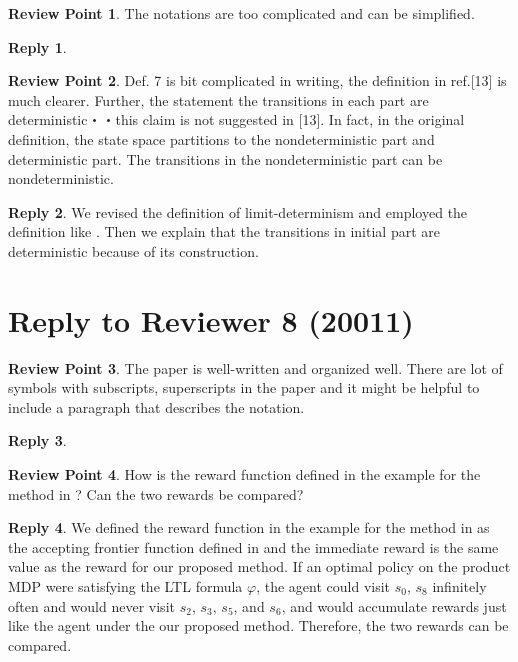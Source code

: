 \documentclass[10 pt, dvipdfmx]{article}
\theoremstyle{definition}
\newtheorem{review point}{Review Point}[section]
\newtheorem*{reply}{Reply}
\begin{document}
\begin{review point}
  The notations are too complicated and can be simplified.
\end{review point}

\begin{reply}

\end{reply}

\begin{review point}
  Def. 7 is bit complicated in writing, the definition in ref.[13] is
much clearer. Further, the statement the transitions in each part are
deterministic・・this claim is not suggested in [13]. In fact, in the
original definition, the state space partitions to the nondeterministic
part and deterministic part. The transitions in the nondeterministic
part can be nondeterministic.
\end{review point}

\begin{reply}
  We revised the definition of limit-determinism and employed the definition like \cite{SEJK2016}. Then we explain that the transitions in initial part are deterministic because of its construction.
\end{reply}

\section{Reply to Reviewer 8 (20011)}

\begin{review point}
  The paper is well-written and organized well. There are lot of
symbols with subscripts, superscripts in the paper and it might be
helpful to include a paragraph that describes the notation.
\end{review point}

\begin{reply}

\end{reply}

\begin{review point}
  How is the reward function defined in the example for the method in
\cite{HAK2019}? Can the two rewards be compared?
\end{review point}

\begin{reply}
  We defined the reward function in the example for the method in \cite{HAK2019} as the accepting frontier function defined in \cite{HAK2019} and the immediate reward is the same value as the reward for our proposed method. If an optimal policy on the product MDP were satisfying the LTL formula $\varphi$, the agent could visit $s_0$, $s_8$ infinitely often and would never visit $s_2$, $s_3$, $s_5$, and $s_6$, and would accumulate rewards just like the agent under the our proposed method. Therefore, the two rewards can be compared.
\end{reply}
\end{document}

